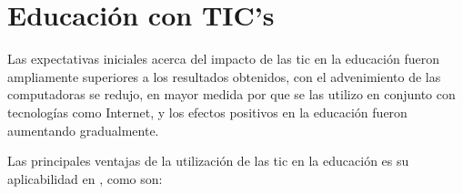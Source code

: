 \section{Educación con TIC's}
\label{sec:tics_EDUCACION_TICS}

Las expectativas iniciales acerca del impacto de las \Gls{tic} en la educación
fueron ampliamente superiores a los resultados obtenidos\cite{unesco:ict}, con
el advenimiento de las computadoras  se redujo,
en mayor medida por que se las utilizo en conjunto con tecnologías como
Internet, y los efectos positivos en la educación fueron aumentando
gradualmente\cite{unesco:ict}.

Las principales ventajas de la utilización de las \Gls{tic} en la educación es
su aplicabilidad en , como son:

